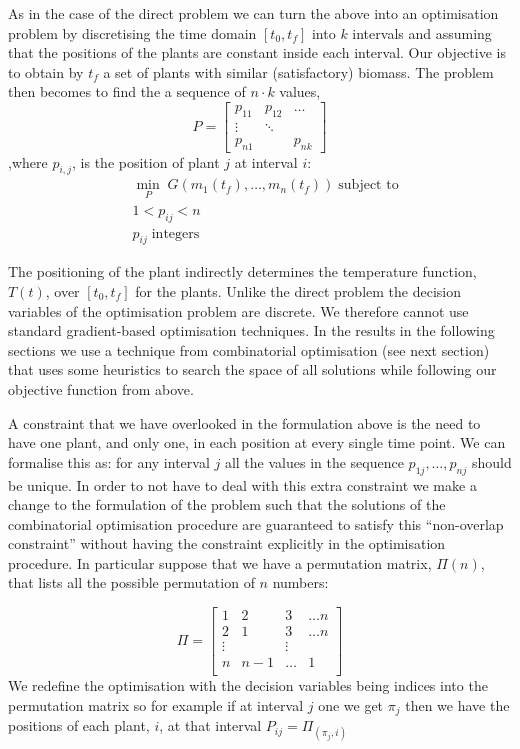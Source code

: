 As in the case of the direct problem we can turn the above into an optimisation
problem by discretising the time domain $[t_0, t_f]$ into $k$ intervals and
assuming that the positions of the plants are constant inside each interval. Our
objective is to obtain by $t_f$ a set of plants with similar (satisfactory)
biomass. The problem then becomes to find the a sequence of $n \cdot k$ values,
$$
P = \begin{bmatrix} 
    p_{11} & p_{12} & \dots \\
    \vdots & \ddots & \\
    p_{n1} &        & p_{nk} 
    \end{bmatrix}
$$
,where $p_{i, j}$, is the position of plant $j$ at interval $i$:
\begin{align*}
& \min_{P} \; G(m_1(t_f), \dots, m_n(t_f)) \; \text{subject to} \\
& 1 < p_{ij} < n \\
& p_{ij} \; \text{integers}
\end{align*}

The positioning of the plant indirectly determines the temperature function,
$T(t)$, over $[t_0, t_f]$ for the plants. Unlike the direct problem the decision
variables of the optimisation problem are discrete. We therefore cannot use
standard gradient-based optimisation techniques. In the results in the following
sections we use a technique from combinatorial optimisation (see next section)
that uses some heuristics to search the space of all solutions while following
our objective function from above.

A constraint that we have overlooked in the formulation above is the need to
have one plant, and only one, in each position at every single time point. We
can formalise this as: for any interval $j$ all the values in the sequence
$p_{1j}, \dots, p_{nj}$ should be unique. In order to not have to deal with this
extra constraint we make a change to the formulation of the problem such that
the solutions of the combinatorial optimisation procedure are guaranteed to
satisfy this ``non-overlap constraint'' without having the constraint explicitly
in the optimisation procedure. In particular suppose that we have a permutation
matrix, $\Pi(n)$, that lists all the possible permutation of $n$ numbers:

$$
\Pi = \begin{bmatrix} 
    1 & 2 & 3 & \dots n \\
    2 & 1 & 3 & \dots n \\
    \vdots &  & \vdots \\
    n &  n-1 & \dots  &  1 \\
    \end{bmatrix}
$$
We redefine the optimisation with the decision variables being indices into the
permutation matrix so for example if at interval $j$ one we get $\pi_j$ then we
have the positions of each plant, $i$, at that interval $P_{ij} = \Pi_{(\pi_j, i)}$

